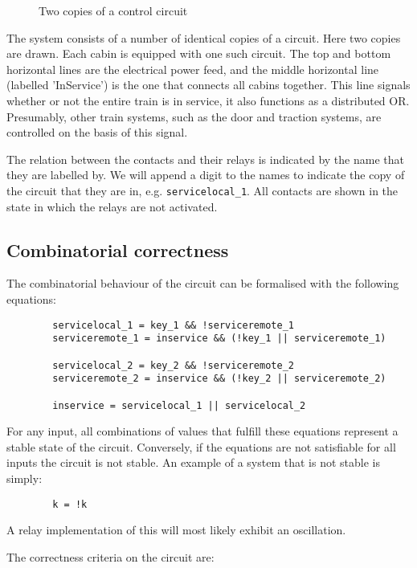 \begin{figure}
\epsfxsize=200pt 
\centerline{}
\caption{Two copies of a control circuit}
\end{figure}

The system consists of a number of identical copies of a circuit. Here two copies are drawn.
Each cabin is equipped with one such circuit.
The top and bottom horizontal lines are the electrical power feed, and the middle horizontal
line (labelled 'InService') is the one that connects all cabins together.
This line signals whether or not the entire
train is in service, it also functions as a distributed OR. Presumably, other train systems, such as the door and traction systems,
are controlled on the basis of this signal.

The relation between the contacts and their relays is indicated by the name that they are
labelled by.
We
will append a digit to the names to indicate the copy of the circuit that they are in, e.g. {\tt servicelocal_1}.
All contacts are shown in the state in which the relays are not activated.

\subsection{Combinatorial correctness}

The combinatorial behaviour of the circuit can be formalised with the following equations:

\begin{verbatim}
        servicelocal_1 = key_1 && !serviceremote_1
        serviceremote_1 = inservice && (!key_1 || serviceremote_1)

        servicelocal_2 = key_2 && !serviceremote_2
        serviceremote_2 = inservice && (!key_2 || serviceremote_2)

        inservice = servicelocal_1 || servicelocal_2
\end{verbatim}

For any input, all combinations of values that fulfill these equations represent a stable state of the
circuit.
Conversely, if the equations are not satisfiable for all inputs the circuit is not stable.
An example of a system that is not stable is simply:
\begin{verbatim}
        k = !k
\end{verbatim}
A relay implementation of this will most likely exhibit an oscillation.



The correctness criteria on the circuit are:

